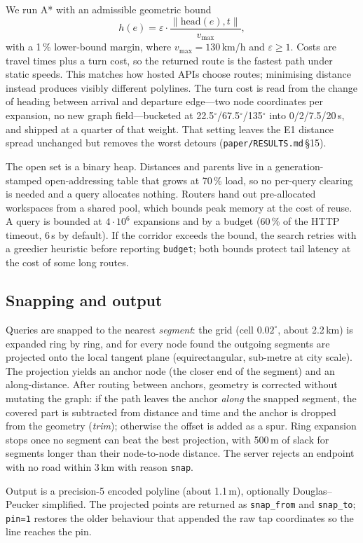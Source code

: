 \documentclass[sigconf,nonacm]{acmart}
\begin{document}
We run A* with an admissible geometric bound
\[
  h(e) = \varepsilon \cdot \frac{\|\mathrm{head}(e),t\|}{v_{\max}},
\]
with a 1\,\% lower-bound margin, where $v_{\max}=130$\,km/h and
$\varepsilon\ge1$. Costs are travel times plus a turn cost, so the returned route
is the fastest path under static speeds. This matches
how hosted APIs choose routes; minimising distance instead produces visibly
different polylines. The turn cost is read from the change of heading between
arrival and departure edge---two node coordinates per expansion, no new graph
field---bucketed at 22.5$^\circ$/67.5$^\circ$/135$^\circ$ into 0/2/7.5/20\,s, and
shipped at a quarter of that weight. That setting leaves the E1 distance spread
unchanged but removes the worst detours (\texttt{paper/RESULTS.md}\,\S15).

The open set is a binary heap. Distances and parents live in a generation-stamped
open-addressing table that grows at 70\,\% load, so no per-query clearing is needed
and a query allocates nothing. Routers hand out pre-allocated workspaces from a
shared pool, which bounds peak memory at the cost of reuse. A query is bounded at
$4\cdot10^6$ expansions and by a budget (60\,\% of the HTTP timeout, 6\,s by
default). If the corridor exceeds the bound, the search retries with a greedier
heuristic before reporting \texttt{budget}; both bounds protect tail latency at
the cost of some long routes.

\subsection{Snapping and output}
Queries are snapped to the nearest \emph{segment}: the grid (cell
$0.02^{\circ}$, about 2.2\,km) is expanded ring by ring, and for every node found
the outgoing segments are projected onto the local tangent plane
(equirectangular, sub-metre at city scale). The projection yields an anchor node
(the closer end of the segment) and an along-distance. After routing between
anchors, geometry is corrected without mutating the graph: if the path leaves the
anchor \emph{along} the snapped segment, the covered part is subtracted from
distance and time and the anchor is dropped from the geometry (\emph{trim});
otherwise the offset is added as a spur. Ring expansion stops once no segment can
beat the best projection, with 500\,m of slack for segments longer than their
node-to-node distance. The server rejects an endpoint with no road within 3\,km
with reason \texttt{snap}.

Output is a precision-5 encoded polyline (about 1.1\,m), optionally
Douglas--Peucker simplified. The projected points are returned as
\texttt{snap\_from} and \texttt{snap\_to}; \texttt{pin=1} restores the older
behaviour that appended the raw tap coordinates so the line reaches the pin.
\end{document}
